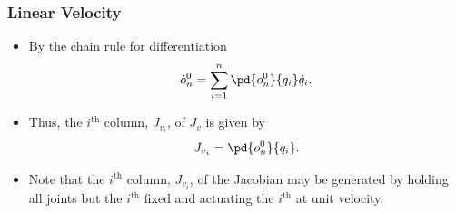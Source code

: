 \begin{frame}
    \frametitle{Linear Velocity}

            \begin{itemize}
                \item By the chain rule for differentiation \[
                \dot{o}_n^0 = \sum_{i=1}^n \pd{o_n^0}{q_i}\dot{q}_i.
                \]
                \item Thus, the $i^{\textrm{th}}$ column, $J_{v_i}$, of $J_v$ is 
                given by \[ J_{v_i} = \pd{o_n^0}{q_i}. \]
                \item Note that the $i^{\textrm{th}}$ column, $J_{v_i}$, of the
                Jacobian may be generated by holding all joints but the
                $i^{\textrm{th}}$ fixed and actuating the $i^{\textrm{th}}$ at 
                unit velocity.
            \end{itemize}
\end{frame}


